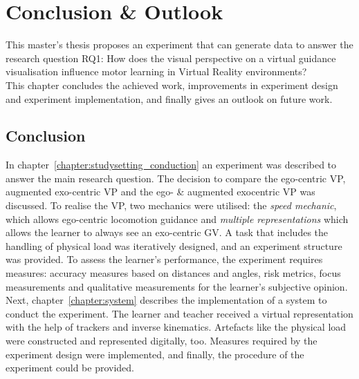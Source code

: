 \chapter{Conclusion \& Outlook}
\label{chapter:conclusion}

This master's thesis proposes an experiment that can generate data to answer the research question RQ1: How does the visual perspective on a virtual guidance visualisation influence motor learning in Virtual Reality environments?\\
This chapter concludes the achieved work, improvements in experiment design and experiment implementation, and finally gives an outlook on future work. 

\section{Conclusion}
In chapter~\ref{chapter:studysetting_conduction} an experiment was described to answer the main research question. The decision to compare the ego-centric VP, augmented exo-centric VP and the ego- \& augmented exocentric VP was discussed. To realise the VP, two mechanics were utilised: the \textit{speed mechanic}, which allows ego-centric locomotion guidance and \textit{multiple representations} which allows the learner to always see an exo-centric GV. A task that includes the handling of physical load was iteratively designed, and an experiment structure was provided. To assess the learner's performance, the experiment requires measures: accuracy measures based on distances and angles, risk metrics, focus measurements and qualitative measurements for the learner's subjective opinion. Next, chapter~\ref{chapter:system} describes the implementation of a system to conduct the experiment. The learner and teacher received a virtual representation with the help of trackers and inverse kinematics. Artefacts like the physical load were constructed and represented digitally, too. Measures required by the experiment design were implemented, and finally, the procedure of the experiment could be provided.\\


